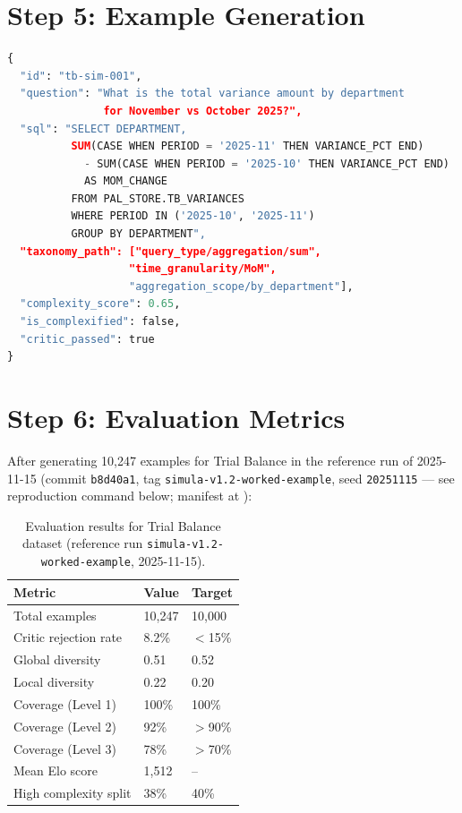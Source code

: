 \section*{Step 5: Example Generation}

\begin{lstlisting}[language=Python,caption={Generated training example}]
{
  "id": "tb-sim-001",
  "question": "What is the total variance amount by department 
               for November vs October 2025?",
  "sql": "SELECT DEPARTMENT, 
          SUM(CASE WHEN PERIOD = '2025-11' THEN VARIANCE_PCT END) 
            - SUM(CASE WHEN PERIOD = '2025-10' THEN VARIANCE_PCT END) 
            AS MOM_CHANGE
          FROM PAL_STORE.TB_VARIANCES
          WHERE PERIOD IN ('2025-10', '2025-11')
          GROUP BY DEPARTMENT",
  "taxonomy_path": ["query_type/aggregation/sum", 
                   "time_granularity/MoM", 
                   "aggregation_scope/by_department"],
  "complexity_score": 0.65,
  "is_complexified": false,
  "critic_passed": true
}
\end{lstlisting}

\section*{Step 6: Evaluation Metrics}

After generating 10,247 examples for Trial Balance in the reference
run of 2025-11-15 (commit \texttt{b8d40a1},
tag \texttt{simula-v1.2-worked-example}, seed \texttt{20251115} ---
see reproduction command below; manifest at
):

\begin{table}[H]
\centering
\caption{Evaluation results for Trial Balance dataset
(reference run \texttt{simula-v1.2-worked-example}, 2025-11-15).}
\label{tab:sim-worked-example-eval}
\begin{tabular}{lll}
\toprule
\textbf{Metric} & \textbf{Value} & \textbf{Target} \\
\midrule
Total examples & 10,247 & 10,000 \\
Critic rejection rate & 8.2\% & $<$15\% \\
Global diversity & 0.51 & 0.52 \\
Local diversity & 0.22 & 0.20 \\
Coverage (Level 1) & 100\% & 100\% \\
Coverage (Level 2) & 92\% & $>$90\% \\
Coverage (Level 3) & 78\% & $>$70\% \\
Mean Elo score & 1,512 & -- \\
High complexity split & 38\% & 40\% \\
\bottomrule
\end{tabular}
\end{table}

